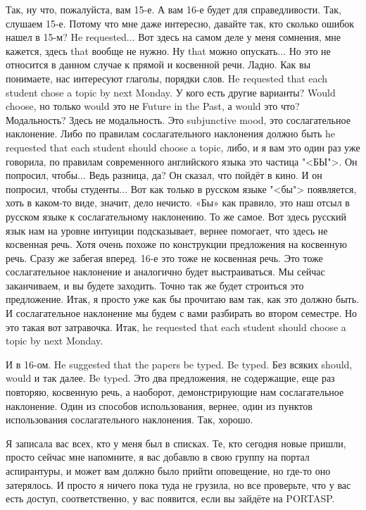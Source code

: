\documentclass[main.tex]{subfiles}
\begin{document}
Так, ну что, пожалуйста, вам 15-е.
А вам 16-е будет для справедливости.
Так, слушаем 15-е.
Потому что мне даже интересно, давайте так, кто сколько ошибок нашел в 15-м?
He requested...
Вот здесь на самом деле у меня сомнения, мне кажется, здесь that вообще не нужно.
Ну that можно опускать...
Но это не относится в данном случае к прямой и косвенной речи.
Ладно.
Как вы понимаете, нас интересуют глаголы, порядки слов.
He requested that each student chose a topic by next Monday. 
У кого есть другие варианты?
Would choose, но только would это не Future in the Past, а would это что?
Модальность?
Здесь не модальность.
Это subjunctive mood, это сослагательное наклонение.
Либо по правилам сослагательного наклонения должно быть he requested that each student should choose a topic, либо, и я вам это один раз уже говорила, по правилам современного английского языка это частица "<БЫ">.
Он попросил, чтобы...
Ведь разница, да?
Он сказал, что пойдёт в кино.
И он попросил, чтобы студенты...
Вот как только в русском языке "<бы"> появляется, хоть в каком-то виде, значит, дело нечисто.
«Бы» как правило, это наш отсыл в русском языке к сослагательному наклонению.
То же самое.
Вот здесь русский язык нам на уровне интуиции подсказывает, вернее помогает, что здесь не косвенная речь.
Хотя очень похоже по конструкции предложения на косвенную речь.
Сразу же забегая вперед.
16-е это тоже не косвенная речь.
Это тоже сослагательное наклонение и аналогично будет выстраиваться.
Мы сейчас заканчиваем, и вы будете заходить.
Точно так же будет строиться это предложение.
Итак, я просто уже как бы прочитаю вам так, как это должно быть.
И сослагательное наклонение мы будем с вами разбирать во втором семестре.
Но это такая вот затравочка.
Итак, he requested that each student should choose a topic by next Monday.

И в 16-ом.
He suggested that the papers be typed.
Be typed.
Без всяких should, would и так далее.
Be typed.
Это два предложения, не содержащие, еще раз повторяю, косвенную речь, а наоборот, демонстрирующие нам сослагательное наклонение.
Один из способов использования, вернее, один из пунктов использования сослагательного наклонения.
Так, хорошо.

Я записала вас всех, кто у меня был в списках.
Те, кто сегодня новые пришли, просто сейчас мне напомните, я вас добавлю в свою группу на портал аспирантуры, и может вам должно было прийти оповещение, но где-то оно затерялось.
И просто я ничего пока туда не грузила, но все проверьте, что у вас есть доступ, соответственно, у вас появится, если вы зайдёте на PORTASP.
\end{document}
